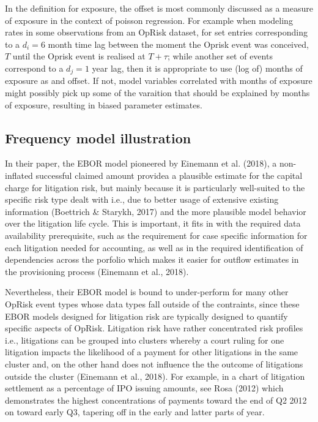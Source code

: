 \documentclass{DissertateUSU}
\begin{document}
In the definition for exposure, the offset is most commonly discussed as
a measure of exposure in the context of poisson regression. For example
when modeling rates in some observations from an OpRisk dataset, for set
entries corresponding to a \(d_i=6\) month time lag between the moment
the Oprisk event was conceived, \(T\) until the Oprisk event is realised
at \(T+\tau\); while another set of events correspond to a \(d_j=1\)
year lag, then it is appropriate to use (log of) months of exposure as
and offset. If not, model variables correlated with months of exposure
might possibly pick up some of the varaition that should be explained by
months of exposure, resulting in biased parameter estimates.

\subsection{Frequency model illustration}
\label{ssec:Frequency model illustration}

In their paper, the EBOR model pioneered by Einemann et al. (2018), a
non-inflated successful claimed amount providea a plausible estimate for
the capital charge for litigation risk, but mainly because it is
particularly well-suited to the specific risk type dealt with i.e., due
to better usage of extensive existing information (Boettrich \& Starykh,
2017) and the more plausible model behavior over the litigation life
cycle. This is important, it fits in with the required data availability
prerequisite, such as the requirement for case specific information for
each litigation needed for accounting, as well as in the required
identification of dependencies across the porfolio which makes it easier
for outflow estimates in the provisioning process (Einemann et al.,
2018).\medskip 

Nevertheless, their EBOR model is bound to under-perform for many other
OpRisk event types whose data types fall outside of the contraints,
since these EBOR models designed for litigation risk are typically
designed to quantify specific aspects of OpRisk. Litigation risk have
rather concentrated risk profiles i.e., litigations can be grouped into
clusters whereby a court ruling for one litigation impacts the
likelihood of a payment for other litigations in the same cluster and,
on the other hand does not influence the the outcome of litigations
outside the cluster (Einemann et al., 2018). For example, in a chart of
litigation settlement as a percentage of IPO issuing amounts, see Rosa
(2012) which demonstrates the highest concentrations of payments toward
the end of Q2 2012 on toward early Q3, tapering off in the early and
latter parts of year.
\end{document}
